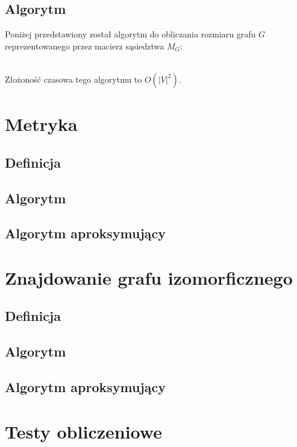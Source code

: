 \documentclass{article}
\begin{document}
\subsection{Algorytm}

\noindent
Poniżej przedstawiony został algorytm do obliczania rozmiaru grafu $G$ reprezentowanego przez macierz sąsiedztwa $M_{G}$:
\\
\begin{algorithmic}
        \EndFor
    \EndFor
\State {}
\end{algorithmic}

\noindent
\\
Złożoność czasowa tego algorytmu to $O(|V|^2)$.

\section{Metryka}
\subsection{Definicja}
\subsection{Algorytm}
\subsection{Algorytm aproksymujący}

\section{Znajdowanie grafu izomorficznego}
\subsection{Definicja}
\subsection{Algorytm}
\subsection{Algorytm aproksymujący}

\section{Testy obliczeniowe}
\end{document}
